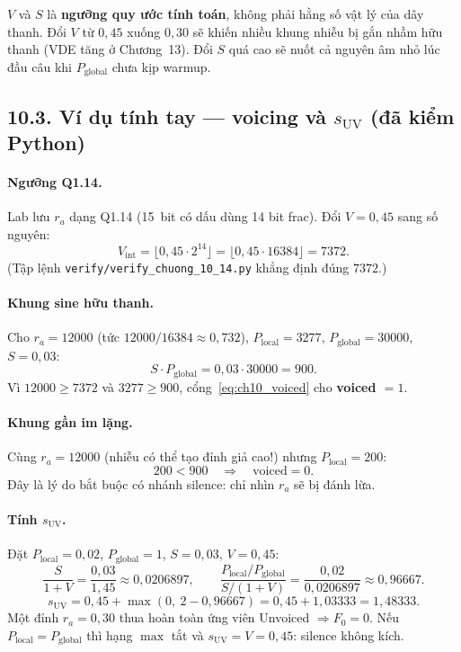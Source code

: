 \begin{physicalinsight}
$V$ và $S$ là \textbf{ngưỡng quy ước tính toán}, không phải hằng số vật lý của dây thanh. Đổi $V$ từ $0{,}45$ xuống $0{,}30$ sẽ khiến nhiều khung nhiễu bị gắn nhầm hữu thanh (VDE tăng ở Chương~13). Đổi $S$ quá cao sẽ nuốt cả nguyên âm nhỏ lúc đầu câu khi $P_{\mathrm{global}}$ chưa kịp warmup.
\end{physicalinsight}

\subsection*{10.3. Ví dụ tính tay --- voicing và $s_{\mathrm{UV}}$ (đã kiểm Python)}

\paragraph{Ngưỡng Q1.14.} Lab lưu $r_a$ dạng Q1.14 (15~bit có dấu dùng 14 bit frac). Đổi $V=0{,}45$ sang số nguyên:
\[
V_{\mathrm{int}}=\bigl\lfloor 0{,}45\cdot 2^{14}\bigr\rfloor=\bigl\lfloor 0{,}45\cdot 16384\bigr\rfloor=7372.
\]
(Tập lệnh \texttt{verify/verify\_chuong\_10\_14.py} khẳng định đúng $7372$.)

\paragraph{Khung sine hữu thanh.} Cho $r_a=12000$ (tức $12000/16384\approx 0{,}732$), $P_{\mathrm{local}}=3277$, $P_{\mathrm{global}}=30000$, $S=0{,}03$:
\[
S\cdot P_{\mathrm{global}}=0{,}03\cdot 30000=900.
\]
Vì $12000\ge 7372$ và $3277\ge 900$, cổng~\eqref{eq:ch10_voiced} cho \textbf{voiced $=1$}.

\paragraph{Khung gần im lặng.} Cùng $r_a=12000$ (nhiễu có thể tạo đỉnh giả cao!) nhưng $P_{\mathrm{local}}=200$:
\[
200 < 900 \quad\Rightarrow\quad \mathrm{voiced}=0.
\]
Đây là lý do bắt buộc có nhánh silence: chỉ nhìn $r_a$ sẽ bị đánh lừa.

\paragraph{Tính $s_{\mathrm{UV}}$.} Đặt $P_{\mathrm{local}}=0{,}02$, $P_{\mathrm{global}}=1$, $S=0{,}03$, $V=0{,}45$:
\[
\frac{S}{1+V}=\frac{0{,}03}{1{,}45}\approx 0{,}0206897,\qquad
\frac{P_{\mathrm{local}}/P_{\mathrm{global}}}{S/(1+V)}=\frac{0{,}02}{0{,}0206897}\approx 0{,}96667.
\]
\[
s_{\mathrm{UV}}=0{,}45+\max(0,\ 2-0{,}96667)=0{,}45+1{,}03333=1{,}48333.
\]
Một đỉnh $r_a=0{,}30$ thua hoàn toàn ứng viên Unvoiced $\Rightarrow F_0=0$. Nếu $P_{\mathrm{local}}=P_{\mathrm{global}}$ thì hạng $\max$ tắt và $s_{\mathrm{UV}}=V=0{,}45$: silence không kích.

